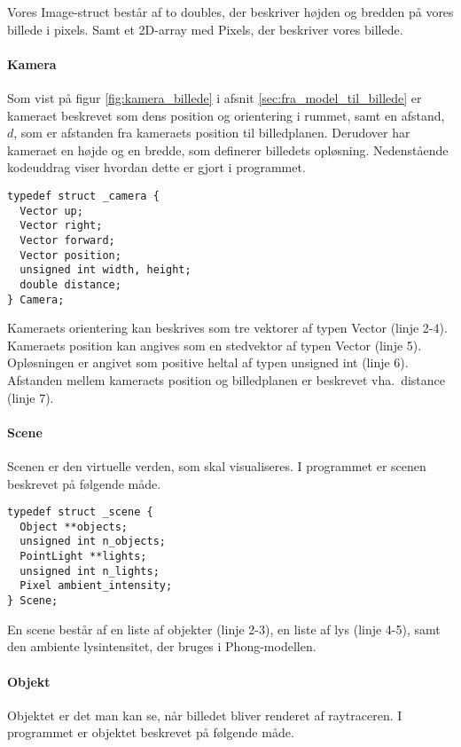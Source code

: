 Vores Image-struct består af to doubles, der beskriver højden og bredden på vores billede i pixels. Samt et 2D-array med Pixels, der beskriver vores billede.

\paragraph{Kamera}
Som vist på figur \ref{fig:kamera_billede} i afsnit \ref{sec:fra_model_til_billede} er kameraet beskrevet som dens position og orientering i rummet, samt en afstand, $d$, som er afstanden fra kameraets position til billedplanen. Derudover har kameraet en højde og en bredde, som definerer billedets opløsning. Nedenstående kodeuddrag viser hvordan dette er gjort i programmet.

\begin{lstlisting}[style=Cstyle, caption=Struct til kamera]
typedef struct _camera {
  Vector up;
  Vector right;
  Vector forward;
  Vector position;
  unsigned int width, height;
  double distance;
} Camera;
\end{lstlisting}

Kameraets orientering kan beskrives som tre vektorer af typen Vector (linje 2-4). Kameraets position kan angives som en stedvektor af typen Vector (linje 5). Opløsningen er angivet som positive heltal af typen unsigned int (linje 6). Afstanden mellem kameraets position og billedplanen er beskrevet vha.\ distance (linje 7).

\paragraph{Scene}
Scenen er den virtuelle verden, som skal visualiseres. I programmet er scenen beskrevet på følgende måde. 

\begin{lstlisting}[style=Cstyle, caption=Struct til scene]
typedef struct _scene {
  Object **objects;
  unsigned int n_objects;
  PointLight **lights;
  unsigned int n_lights;
  Pixel ambient_intensity;
} Scene;
\end{lstlisting}

En scene består af en liste af objekter (linje 2-3), en liste af lys (linje 4-5), samt den ambiente lysintensitet, der bruges i Phong-modellen.

\paragraph{Objekt}
Objektet er det man kan se, når billedet bliver renderet af raytraceren. I programmet er objektet beskrevet på følgende måde.

